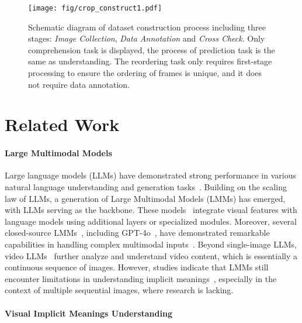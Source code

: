 \begin{figure*}[t]
\centering
\texttt{[image: fig/crop\_construct1.pdf]}
\caption{Schematic diagram of \dataset{} dataset construction process including three stages: \textit{Image Collection}, \textit{Data Annotation} and \textit{Cross Check}. Only comprehension task is displayed, the process of prediction task is the same as understanding. The reordering task only requires first-stage processing to ensure the ordering of frames is unique, and it does not require data annotation.}
\label{fig:construct}
\end{figure*}

\section{Related Work}

\paragraph{Large Multimodal Models}

Large language models (LLMs) have demonstrated strong performance in various natural language understanding and generation tasks~\cite{dubey2024llama, liu2024deepseek, ray2023chatgpt}. Building on the scaling law of LLMs, a generation of Large Multimodal Models (LMMs) has emerged, with LLMs serving as the backbone. These models~\cite{qwen2.5-VL, Qwen2VL, Zhu:2024minigpt-4, liu2023improvedllava, wang2023cogvlm, ye2023mplugowl2} integrate visual features with language models using additional layers or specialized modules. Moreover, several closed-source LMMs~\cite{reid2024gemini, driess2023palm, yang2023dawn}, including GPT-4o~\cite{hurst2024gpt40}, have demonstrated remarkable capabilities in handling complex multimodal inputs~\cite{yue2024mmmu, fu2023mme, li2023seed}. Beyond single-image LLMs, video LLMs~\cite{zhang2025videollama, ye2024mplug, zhang2410video} further analyze and understand video content, which is essentially a continuous sequence of images. However, studies indicate that LMMs still encounter limitations in understanding implicit meanings~\cite{yang2024:deepsemantic, liu2023mmbench, yang2023mm}, especially in the context of multiple sequential images, where research is lacking.

\paragraph{Visual Implicit Meanings Understanding}

